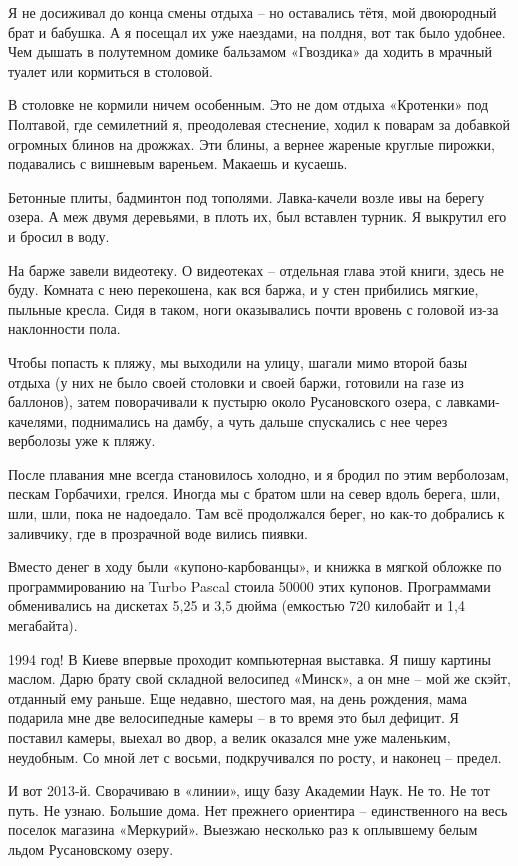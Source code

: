Я не досиживал до конца смены отдыха – но оставались тётя, мой двоюродный брат и бабушка. А я посещал их уже наездами, на полдня, вот так было удобнее. Чем дышать в полутемном домике бальзамом «Гвоздика» да ходить в мрачный туалет или кормиться в столовой.

В столовке не кормили ничем особенным. Это не дом отдыха «Кротенки» под Полтавой, где семилетний я, преодолевая стеснение, ходил к поварам за добавкой огромных блинов на дрожжах. Эти блины, а вернее жареные круглые пирожки, подавались с вишневым вареньем. Макаешь и кусаешь.

Бетонные плиты, бадминтон под тополями. Лавка-качели возле ивы на берегу озера. А меж двумя деревьями, в плоть их, был вставлен турник. Я выкрутил его и бросил в воду. 

На барже завели видеотеку. О видеотеках – отдельная глава этой книги, здесь не буду. Комната с нею перекошена, как вся баржа, и у стен прибились мягкие, пыльные кресла. Сидя в таком, ноги оказывались почти вровень с головой из-за наклонности пола.

Чтобы попасть к пляжу, мы выходили на улицу, шагали мимо второй базы отдыха (у них не было своей столовки и своей баржи, готовили на газе из баллонов), затем поворачивали к пустырю около Русановского озера, с лавками-качелями, поднимались на дамбу, а чуть дальше спускались с нее через верболозы уже к пляжу. 

После плавания мне всегда становилось холодно, и я бродил по этим верболозам, пескам Горбачихи, грелся. Иногда мы с братом шли на север вдоль берега, шли, шли, шли, пока не надоедало. Там всё продолжался берег, но как-то добрались к заливчику, где в прозрачной воде вились пиявки.

Вместо денег в ходу были «купоно-карбованцы», и книжка в мягкой обложке по программированию на Turbo Pascal стоила 50000 этих купонов. Программами обменивались на дискетах 5,25 и 3,5 дюйма (емкостью 720 килобайт и 1,4 мегабайта). 

1994 год! В Киеве впервые проходит компьютерная выставка. Я пишу картины маслом. Дарю брату свой складной велосипед «Минск», а он мне – мой же скэйт, отданный ему раньше. Еще недавно, шестого мая, на день рождения, мама подарила мне две велосипедные камеры – в то время это был дефицит. Я поставил камеры, выехал во двор, а велик оказался мне уже маленьким, неудобным. Со мной лет с восьми, подкручивался по росту, и наконец – предел.

И вот 2013-й. Сворачиваю в «линии», ищу базу Академии Наук. Не то. Не тот путь. Не узнаю. Большие дома. Нет прежнего ориентира – единственного на весь поселок магазина «Меркурий». Выезжаю несколько раз к оплывшему белым льдом Русановскому озеру. 

